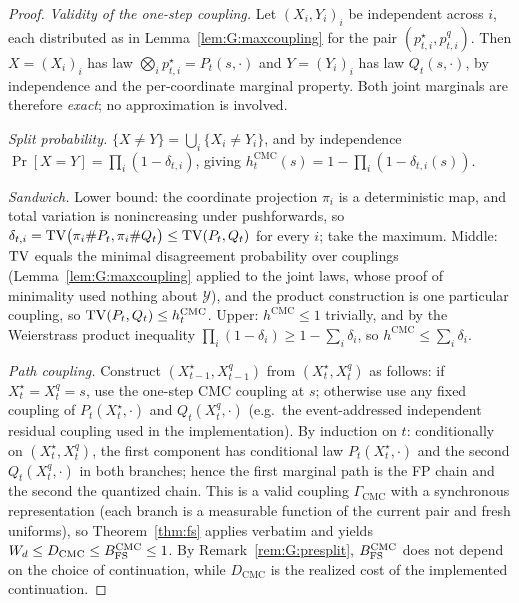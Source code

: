\begin{proof}
\emph{Validity of the one-step coupling.} Let $(X_{i},Y_{i})_{i}$ be independent across $i$, each
distributed as in Lemma~\ref{lem:G:maxcoupling} for the pair
$(p^{\star}_{t,i},p^{q}_{t,i})$. Then $X=(X_{i})_{i}$ has law
$\bigotimes_{i}p^{\star}_{t,i}=P_{t}(s,\cdot)$ and $Y=(Y_{i})_{i}$ has law $Q_{t}(s,\cdot)$, by
independence and the per-coordinate marginal property. Both joint marginals are therefore
\emph{exact}; no approximation is involved.

\emph{Split probability.} $\{X\neq Y\}=\bigcup_{i}\{X_{i}\neq Y_{i}\}$, and by independence
$\Pr[X=Y]=\prod_{i}(1-\delta_{t,i})$, giving
$h^{\mathrm{CMC}}_{t}(s)=1-\prod_{i}(1-\delta_{t,i}(s))$.

\emph{Sandwich.} Lower bound: the coordinate projection $\pi_{i}$ is a deterministic map, and
total variation is nonincreasing under pushforwards, so
$\delta_{t,i}=\mathrm{TV}\big(\pi_{i}\#P_{t},\pi_{i}\#Q_{t}\big)\le\mathrm{TV}(P_{t},Q_{t})$ for every $i$; take
the maximum. Middle: $\mathrm{TV}$ equals the minimal disagreement probability over couplings
(Lemma~\ref{lem:G:maxcoupling} applied to the joint laws, whose proof of minimality used nothing
about $\mathcal{Y}$), and the product construction is one particular coupling, so
$\mathrm{TV}(P_{t},Q_{t})\le h^{\mathrm{CMC}}_{t}$. Upper: $h^{\mathrm{CMC}}\le1$ trivially, and by the
Weierstrass product inequality $\prod_{i}(1-\delta_{i})\ge1-\sum_{i}\delta_{i}$, so
$h^{\mathrm{CMC}}\le\sum_{i}\delta_{i}$.

\emph{Path coupling.} Construct $(X^{\star}_{t-1},X^{q}_{t-1})$ from
$(X^{\star}_{t},X^{q}_{t})$ as follows: if $X^{\star}_{t}=X^{q}_{t}=s$, use the one-step CMC
coupling at $s$; otherwise use any fixed coupling of
$P_{t}(X^{\star}_{t},\cdot)$ and $Q_{t}(X^{q}_{t},\cdot)$ (e.g.\ the event-addressed independent
residual coupling used in the implementation). By induction on $t$: conditionally on
$(X^{\star}_{t},X^{q}_{t})$, the first component has conditional law
$P_{t}(X^{\star}_{t},\cdot)$ and the second $Q_{t}(X^{q}_{t},\cdot)$ in both branches; hence the
first marginal path is the FP chain and the second the quantized chain. This is a valid coupling
$\Gamma_{\mathrm{CMC}}$ with a synchronous representation (each branch is a measurable function
of the current pair and fresh uniforms), so Theorem~\ref{thm:fs} applies verbatim and yields
$W_{d}\le D_{\mathrm{CMC}}\le B_{\mathrm{FS}}^{\mathrm{CMC}}\le1$. By Remark~\ref{rem:G:presplit},
$B_{\mathrm{FS}}^{\mathrm{CMC}}$ does not depend on the choice of continuation, while $D_{\mathrm{CMC}}$ is
the realized cost of the implemented continuation.
\end{proof}

